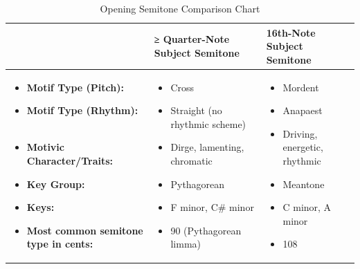 \begin{table}[H]
\begin{singlespace}
\small
\centering
\begin{tabularx}{5.5in}{|>{\RaggedRight}X|>{\RaggedRight}X|>{\RaggedRight}X|}
\hline
                                  & \textbf{ ≥ Quarter-Note \newline Subject Semitone} & \textbf{16th-Note \newline Subject Semitone} \\
\hline
\vspace{-1em}
\begin{itemize}[leftmargin=0cm]
    \item[] \textbf{Motif Type (Pitch):                          }
    \item[] \textbf{Motif Type (Rhythm): \newline ~              }
    \item[] \textbf{Motivic \newline \mbox{Character/Traits}:    }
    \item[] \textbf{Key Group:                                   }
    \item[] \textbf{Keys:                                        }
    \item[] \textbf{Most common semitone \newline type in cents: }
\end{itemize}

                                  &

\vspace{-1em}
\begin{itemize}[leftmargin=*]
\item Cross
\item Straight \newline (no rhythmic scheme)
\item Dirge, lamenting, \newline chromatic
\item Pythagorean
\item F minor, C\# minor
\item 90 (Pythagorean limma)
\end{itemize}
                                  &

\vspace{-1em}
\begin{itemize}[leftmargin=*]
\item Mordent
\item Anapaest \newline ~
\item Driving, energetic, \newline rhythmic
\item Meantone
\item C minor, A minor
\item 108
\end{itemize}

\\

\hline
\end{tabularx}
\small
\end{singlespace}
\caption{Opening Semitone Comparison Chart}
\end{table}
